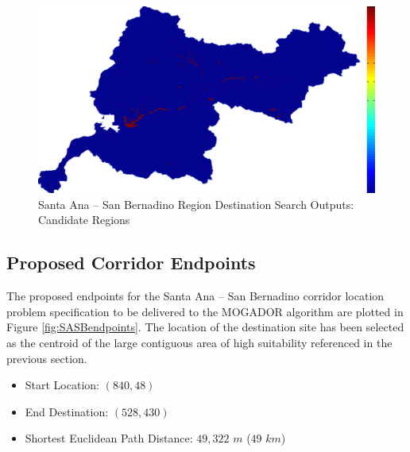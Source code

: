         \begin{figure}[!h]
            \begin{center}
            \includegraphics[width=5.5in]{figures/SanBernadino_Search_Output.png}   
            \caption{Santa Ana -- San Bernadino Region Destination Search Outputs: Candidate Regions}
            \label{fig:SASBdsoutputs_cand}
            \end{center}
        \end{figure}

    \subsection{Proposed Corridor Endpoints}
    
The proposed endpoints for the Santa Ana -- San Bernadino corridor location problem specification to be delivered to the MOGADOR algorithm are plotted in Figure \ref{fig:SASBendpoints}. The location of the destination site has been selected as the centroid of the large contiguous area of high suitability referenced in the previous section.
    
    \begin{itemize}
      \setlength{\itemsep}{0cm}
      \setlength{\parskip}{0cm}
        \item Start Location: $(840,48)$
        \item End Destination: $(528,430)$
        \item Shortest Euclidean Path Distance: $49,322$ $m$ ($49$ $km$)
    \end{itemize}
    
